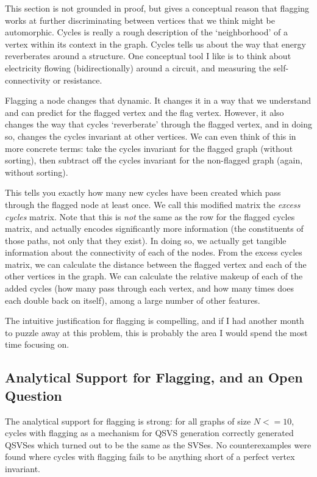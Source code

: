 This section is not grounded in proof, but gives a conceptual reason that flagging works at further discriminating between vertices that we think might be automorphic.
Cycles is really a rough description of the `neighborhood' of a vertex within its context in the graph.
Cycles tells us about the way that energy reverberates around a structure.
One conceptual tool I like is to think about electricity flowing (bidirectionally) around a circuit, and measuring the self-connectivity or resistance.

Flagging a node changes that dynamic.
It changes it in a way that we understand and can predict for the flagged vertex and the flag vertex.
However, it also changes the way that cycles `reverberate' through the flagged vertex, and in doing so, changes the cycles invariant at other vertices.
We can even think of this in more concrete terms: take the cycles invariant for the flagged graph (without sorting), then subtract off the cycles invariant for the non-flagged graph (again, without sorting).

This tells you exactly how many new cycles have been created which pass through the flagged node at least once.
We call this modified matrix the \emph{excess cycles} matrix.
Note that this is \emph{not} the same as the row for the flagged cycles matrix, and actually encodes significantly more information (the constituents of those paths, not only that they exist).
In doing so, we actually get tangible information about the connectivity of each of the nodes.
From the excess cycles matrix, we can calculate the distance between the flagged vertex and each of the other vertices in the graph.
We can calculate the relative makeup of each of the added cycles (how many pass through each vertex, and how many times does each double back on itself), among a large number of other features.

The intuitive justification for flagging is compelling, and if I had another month to puzzle away at this problem, this is probably the area I would spend the most time focusing on.

\subsection{Analytical Support for Flagging, and an Open Question}

The analytical support for flagging is strong:
for all graphs of size $N<=10$, cycles with flagging as a mechanism for QSVS generation correctly generated QSVSes which turned out to be the same as the SVSes.
No counterexamples were found where cycles with flagging fails to be anything short of a perfect vertex invariant.

